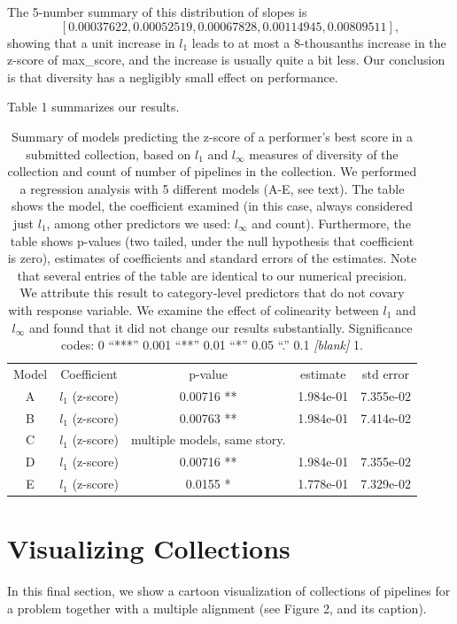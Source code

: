 \documentclass{article}
\begin{document}
The 5-number summary of this distribution of slopes is
$$[0.00037622, 0.00052519, 0.00067828, 0.00114945, 0.00809511],$$
showing that a unit increase in $l_1$ leads to at most a 8-thousanths
increase in the z-score of max\_score, and the increase is usually
quite a bit less.  Our conclusion is that diversity has a negligibly
small effect on performance.

Table 1 summarizes our results.

\begin{table}
  \begin{tabular}{c|c|c|c|c}
    Model & Coefficient & p-value & estimate & std error \\
    A  & $l_1$ (z-score) & 0.00716 ** & 1.984e-01 & 7.355e-02 \\
    B  & $l_1$ (z-score) & 0.00763 ** & 1.984e-01 & 7.414e-02 \\
    C  & $l_1$ (z-score) & multiple models, same story. & & \\
    D  & $l_1$ (z-score) & 0.00716 ** & 1.984e-01 & 7.355e-02 \\
    E  & $l_1$ (z-score) & 0.0155  *  & 1.778e-01 & 7.329e-02 \\
  \end{tabular}
  \caption{Summary of models predicting the z-score of a performer's
    best score in a submitted collection, based on $l_1$ and
    $l_\infty$ measures of diversity of the collection and count of
    number of pipelines in the collection.  We performed a regression
    analysis with 5 different models (A-E, see text).  The table
    shows the model, the coefficient examined (in this case, always
    considered just $l_1$, among other predictors we used: $l_\infty$
    and count).  Furthermore, the table shows p-values (two tailed,
    under the null hypothesis that coefficient is zero), estimates of
    coefficients and standard errors of the estimates.  Note that
    several entries of the table are identical to our numerical
    precision.  We attribute this result to category-level predictors
    that do not covary with response variable.  We examine the effect
    of colinearity between $l_1$ and $l_\infty$ and found that it did
    not change our results substantially. Significance codes: 0
    ``***'' 0.001 ``**'' 0.01 ``*'' 0.05 ``.''  0.1 \emph{[blank]} 1.}
\end{table}

\section{Visualizing Collections}
\label{sec:visualization}
In this final section, we show a cartoon visualization of collections
of pipelines for a problem together with a multiple alignment (see
Figure 2, and its caption).
\end{document}
